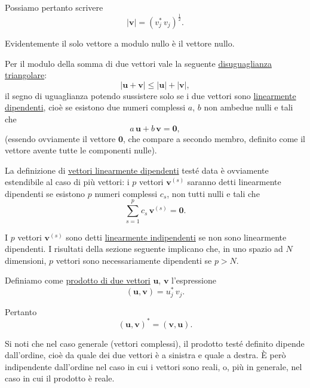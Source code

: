 \documentclass[11pt, a4paper]{book}
\numberwithin{equation}{section}
\begin{document}
Possiamo pertanto scrivere
\begin{equation}
    |\mathbf{v}| = \left( v_j^*\, v_j \right)^{\frac{1}{2}}.
    \tag{1b}
\end{equation}

Evidentemente il solo vettore a modulo nullo è il vettore nullo.

Per il modulo della somma di due vettori vale la seguente \uline{disuguaglianza triangolare}:
\begin{equation}
    |\mathbf{u} + \mathbf{v}| \leq |\mathbf{u}| + |\mathbf{v}|,
    \tag{2}
\end{equation}
il segno di uguaglianza potendo sussistere solo se i due vettori sono \uline{linearmente dipendenti}, cioè se esistono due numeri complessi $a$, $b$ non ambedue nulli e tali che
\begin{equation}
    a\,\mathbf{u} + b\,\mathbf{v} = \mathbf{0},
    \tag{2'}
\end{equation}
(essendo ovviamente il vettore $\mathbf{0}$, che compare a secondo membro, definito come il vettore avente tutte le componenti nulle).

La definizione di \uline{vettori linearmente dipendenti} testé data è ovviamente estendibile al caso di più vettori: i $p$ vettori $\mathbf{v}^{(s)}$ saranno detti linearmente dipendenti se esistono $p$ numeri complessi $c_s$, non tutti nulli e tali che
\[
    \sum_{s=1}^{p} c_s\, \mathbf{v}^{(s)} = \mathbf{0}.
\]

I $p$ vettori $\mathbf{v}^{(s)}$ sono detti \uline{linearmente indipendenti} se non sono linearmente dipendenti. I risultati della sezione seguente implicano che, in uno spazio ad $N$ dimensioni, $p$ vettori sono necessariamente dipendenti se $p > N$.

Definiamo come \uline{prodotto di due vettori} $\mathbf{u}$, $\mathbf{v}$ l'espressione
\begin{equation}
    (\mathbf{u}, \mathbf{v}) = u_j^*\, v_j.
    \tag{3}
\end{equation}

Pertanto
\begin{equation}
    (\mathbf{u}, \mathbf{v})^* = (\mathbf{v}, \mathbf{u}).
    \tag{4}
\end{equation}

Si noti che nel caso generale (vettori complessi), il prodotto testé definito dipende dall'ordine, cioè da quale dei due vettori è a sinistra e quale a destra. È però indipendente dall'ordine nel caso in cui i vettori sono reali, o, più in generale, nel caso in cui il prodotto è reale.
\end{document}

